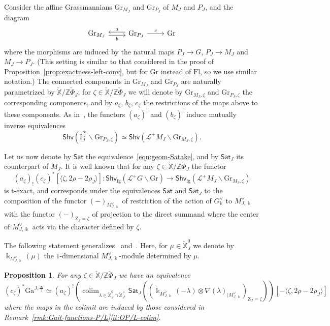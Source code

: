 \documentclass[11pt]{amsart}
\numberwithin{equation}{section}
\theoremstyle{plain}
\newtheorem{prop}[thm]{Proposition}
\theoremstyle{definition}
\newcommand{\I}{{\mathrm I}}
\renewcommand{\k}{\Bbbk}
\newcommand{\sL}{{\mathcal L}}
\newcommand{\X}{{\mathbb X}}
\newcommand{\Xd}{\check{\X}}
\newcommand{\Z}{{\mathbb Z}}
\newcommand{\semi}{{{\frac{\infty}{2}}}}
\newcommand{\Shv}{\mathsf{Shv}}
\newcommand{\Shvfg}{\mathsf{Shv}_{\mathrm{fg}}}
\newcommand{\Fl}{\mathrm{Fl}}
\newcommand{\Gr}{\mathrm{Gr}}
\newcommand{\comp}{\mathrm{c}}
\newcommand{\Gait}{\mathrm{Ga}}
\newcommand{\Sat}{\mathsf{Sat}}
\DeclareMathOperator*{\colim}{colim}
\begin{document}
Consider the affine Grassmannians $\Gr_{M_J}$ and $\Gr_{P_J}$ of $M_J$ and $P_J$, and the diagram
\[
\begin{tikzcd}
\Gr_{M_J} \ar[r, "b"',shift right=0.5ex] & \Gr_{P_J} \ar[r, "c"] \ar[l, "a"', shift right=0.5ex] & \Gr
\end{tikzcd}
\]
where the morphisms are induced by the natural maps $P_J \to G$, $P_J \to M_J$ and $M_J \to P_J$. (This setting is similar to that considered in the proof of Proposition~\ref{prop:exactness-left-conv}, but for $\Gr$ instead of $\Fl$, so we use similar notation.) The connected components in $\Gr_{M_J}$ and $\Gr_{P_J}$ are naturally parametrized by $\Xd / \Z {\check \Phi}_J$; for $\zeta \in \Xd / \Z {\check \Phi}_J$ we will denote by $\Gr_{M_J, \zeta}$ and $\Gr_{P_J,\zeta}$ the corresponding components, and by $a_\zeta$, $b_\zeta$, $c_\zeta$ the restrictions of the maps above to these components. As in~\cite[Lemma~3.3.2]{DL23}, the functors $(a_\zeta)^!$ and $(b_\zeta)^!$ induce mutually inverse equivalences
\begin{equation}
\label{eqn:equiv-Gr-P-M}
\Shv \left( \I_J^\semi \backslash \Gr_{P_J, \zeta} \right) \simeq \Shv \left( \sL^+ M_J \backslash \Gr_{M_J, \zeta} \right).
\end{equation}

Let us now denote by $\Sat$ the equivalence~\eqref{eqn:geom-Satake}, and by $\Sat_{J}$ its counterpart of $M_J$. It is well known that for any $\zeta \in \Xd / \Z {\check \Phi}_J$ the functor
\[
(a_\zeta)_! (c_\zeta)^* [\langle \zeta, 2\rho-2\rho_J \rangle] : \Shvfg \left( \sL^+ G \backslash \Gr \right) \to \Shvfg \left( \sL^+ M_J \backslash \Gr_{M_J,\zeta} \right)
\]
is t-exact, and corresponds under the equivalences $\Sat$ and $\Sat_J$ to the composition of the functor $(-)_{M^\vee_{J,\k}}$ of restriction of the action of $G^\vee_\k$ to $M^\vee_{J,\k}$ with the functor $(-)_{\mathrm{Z}_J=\zeta}$ of projection to the direct summand where the center of $M_{J,\k}^\vee$ acts via the character defined by $\zeta$.

The following statement generalizes~\cite[Proposition~4.1.12]{DL23} and~\cite[Remark~8.3]{adr}. Here, for $\mu \in \Xd^0_J$ we denote by $\k_{M^\vee_{J,\k}}(\mu)$ the $1$-dimensional $M^\vee_{J,\k}$-module determined by $\mu$.

\begin{prop}
For any $\zeta \in \Xd / \Z {\check \Phi}_J$ we have an equivalence
\[
(c_\zeta)^* \Gait^{J,\semi} \simeq (a_\zeta)^! \left( \colim_{\lambda \in \Xd_J^0 \cap \Xd^+_{J^\comp}} \Sat_J \left( (\k_{M^\vee_{J,\k}}(-\lambda) \otimes \nabla(\lambda)_{| M^\vee_{J,\k}})_{\mathrm{Z}_J=\zeta} \right) \right)[- \langle \zeta, 2\rho-2\rho_J \rangle]
\]
where the maps in the colimit are induced by those considered in Remark~\ref{rmk:Gait-functions-P/L}\eqref{it:OP/L-colim}.
\end{prop}
\end{document}
